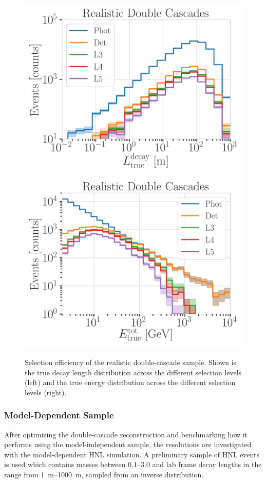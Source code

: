 \begin{figure}[h]
	\centering
    \includegraphics[width=0.49\linewidth]{figures/model_independent_simulation/results/realistic/selection/hnl_selection_efficiency_decay_l_true_unweighted.png}
    \includegraphics[width=0.49\linewidth]{figures/model_independent_simulation/results/realistic/selection/hnl_selection_efficiency_energy_true_unweighted.png}
    \caption[Realistic double-cascade selection efficiency]{Selection efficiency of the realistic  double-cascade sample. Shown is the true decay length distribution across the different selection levels (left) and the true energy distribution across the different selection levels (right).}
\end{figure}


\subsubsection{Model-Dependent Sample}

After optimizing the double-cascade reconstruction and benchmarking how it performs using the model-independent sample, the resolutions are investigated with the model-dependent HNL simulation. A preliminary sample of HNL events is used which contains masses between \SIrange[range-phrase=~and~]{0.1}{3.0}{\gev} and lab frame decay lengths in the range from \SIrange{1}{1000}{\meter}, sampled from an inverse distribution.

